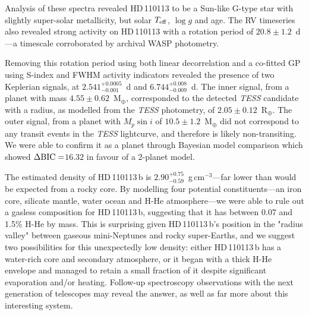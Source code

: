 \documentclass[fleqn,usenatbib]{mnras}
\newcommand{\gcm}{g\,cm$^{-3}$}	%
\newcommand{\tess}{{\it TESS}}
\newcommand{\rearth}{R$_{\oplus}$}
\newcommand{\mearth}{M$_{\oplus}$}
\newcommand{\teff}{$T_{\rm eff}$}
\newcommand{\logg}{$\log g$}
\newcommand{\TPzero}{ $ 2.541^{+0.0005}_{-0.001} $ }
\newcommand{\TPone}{ $ 6.744^{+0.008}_{-0.009} $ }
\newcommand{\TMpzero}{ $ 4.55 \pm 0.62 $ }
\newcommand{\TMpone}{ $ 10.5 \pm 1.2 $ }
\newcommand{\Trpl}{ $ 2.05 \pm 0.12 $ }
\newcommand{\Trhopgcmthree}{ $ 2.90^{+0.75}_{-0.59} $ }
\newcommand{\Tperiod}{ $ 20.8 \pm 1.2 $ }
\newcommand{\Tstar}{HD\,110113}
\newcommand{\Tplanet}{HD\,110113\,b}
\newcommand{\TdeltaBIC}{$16.32$}
\begin{document}
Analysis of these spectra revealed \Tstar{} to be a Sun-like G-type star with slightly super-solar metallicity, but solar \teff{}, \logg{} and age.
The RV timeseries also revealed strong activity on \Tstar{} with a rotation period of \Tperiod{}\,d---a timescale corroborated by archival WASP photometry.

Removing this rotation period using both linear decorrelation and a co-fitted GP using S-index and FWHM activity indicators revealed the presence of two Keplerian signals, at \TPzero{}\,d and \TPone{}\,d.
The inner signal, from a planet with mass \TMpzero{}\,\mearth{}, corresponded to the detected \tess{} candidate with a radius, as modelled from the \tess{} photometry, of \Trpl{}\,\rearth{}.
The outer signal, from a planet with $M_p\sin{i}$ of \TMpone{}\,\mearth{} did not correspond to any transit events in the \tess{} lightcurve, and therefore is likely non-transiting.
We were able to confirm it as a planet through Bayesian model comparison which showed $\Delta{\rm BIC}= $\TdeltaBIC{} in favour of a 2-planet model.

The estimated density of \Tplanet{} is \Trhopgcmthree{}\,\gcm{}---far lower than would be expected from a rocky core.
By modelling four potential constituents---an iron core, silicate mantle, water ocean and H-He atmosphere---we were able to rule out a gasless composition for \Tplanet{}, suggesting that it has between 0.07 and 1.5\% H-He by mass.
This is surprising given \Tplanet{}'s position in the "radius valley" between gaseous mini-Neptunes and rocky super-Earths, and we suggest two possibilities for this unexpectedly low density: either \Tplanet{} has a water-rich core and secondary atmosphere, or it began with a thick H-He envelope and managed to retain a small fraction of it despite significant evaporation and/or heating.
Follow-up spectroscopy observations with the next generation of telescopes may reveal the answer, as well as far more about this interesting system.

\end{document}
